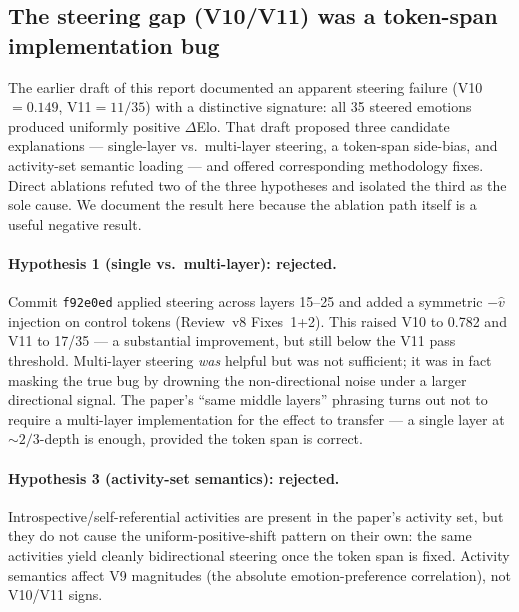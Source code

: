 \documentclass[11pt,a4paper]{article}
\begin{document}
\subsection{The steering gap (V10/V11) was a token-span implementation bug}
\label{sec:gap-steering}

The earlier draft of this report documented an apparent steering
failure (V10$=0.149$, V11$=11/35$) with a distinctive signature:
all 35 steered emotions produced uniformly positive $\Delta$Elo.
That draft proposed three candidate explanations --- single-layer
vs.\ multi-layer steering, a token-span side-bias, and activity-set
semantic loading --- and offered corresponding methodology fixes.
Direct ablations refuted two of the three hypotheses and isolated
the third as the sole cause.  We document the result here because
the ablation path itself is a useful negative result.

\paragraph{Hypothesis 1 (single vs.\ multi-layer): rejected.}
Commit \texttt{f92e0ed} applied steering across layers 15--25 and
added a symmetric $-\hat{v}$ injection on control tokens (Review~v8
Fixes~1+2).  This raised V10 to 0.782 and V11 to 17/35 --- a
substantial improvement, but still below the V11 pass threshold.
Multi-layer steering \emph{was} helpful but was not sufficient; it
was in fact masking the true bug by drowning the non-directional
noise under a larger directional signal.  The paper's ``same middle
layers'' phrasing turns out not to require a multi-layer
implementation for the effect to transfer --- a single layer at
$\sim 2/3$-depth is enough, provided the token span is correct.

\paragraph{Hypothesis 3 (activity-set semantics): rejected.}
Introspective/self-referential activities are present in the paper's
activity set, but they do not cause the uniform-positive-shift
pattern on their own: the same activities yield cleanly bidirectional
steering once the token span is fixed.  Activity semantics affect V9
magnitudes (the absolute emotion-preference correlation), not V10/V11
signs.
\end{document}
